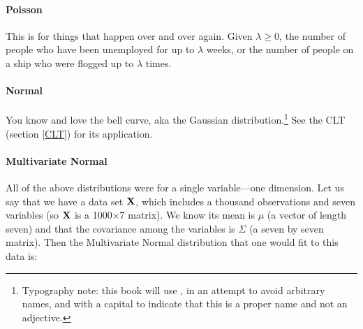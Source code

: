 \paragraph{Poisson}

This is for things that happen over and over again. Given
$\lambda\geq0$, 
the number of people who have been unemployed for
up to $\lambda$ weeks,
or the number of people on a ship who were flogged up to
$\lambda$ times. 


\paragraph{Normal}

You know and love the bell curve, aka the Gaussian distribution.\footnote{Typography note: this book will use , in an attempt to avoid arbitrary names, and with a capital to indicate that this is a proper name and not an adjective.} See the CLT (section \ref{CLT}) for
its application.


\paragraph{Multivariate Normal}
All of the above distributions were for a single variable---one
dimension. Let us say that we have a data set ${\bf X}$, which includes a
thousand observations and seven variables (so ${\bf X}$ is a 1000$\times$7
matrix). We know its mean is
$\mu$ (a vector of length seven) and that the covariance among the
variables is $\Sigma$ (a seven by seven matrix). Then the Multivariate
Normal distribution that one would fit to this data is:


